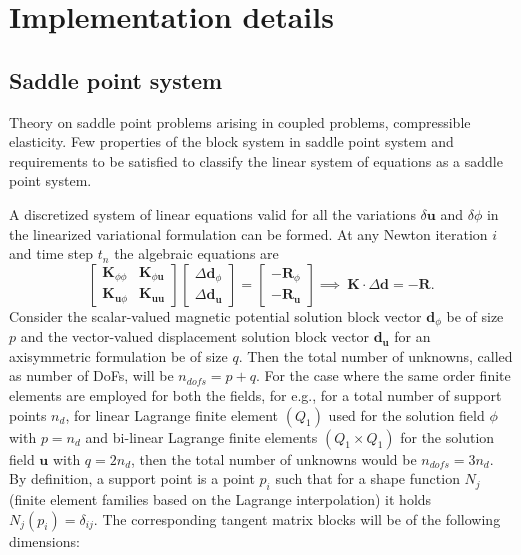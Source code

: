 \documentclass[11pt,a4paper,final]{article}
\begin{document}
\section{Implementation details}

\subsection{Saddle point system}
Theory on saddle point problems arising in coupled problems, compressible elasticity. Few properties of the block system in saddle point system and requirements to be satisfied to classify the linear system of equations as a saddle point system. \par 

A discretized system of linear equations valid for all the variations $\delta \mathbf{u}$ and $\delta \phi$ in the linearized variational formulation can be formed. At any Newton iteration $i$ and time step $t_n$ the algebraic equations are
\begin{equation}
\begin{bmatrix}
\mathbf{K}_{\phi \phi} & \mathbf{K}_{\phi \mathbf{u}} \\
\mathbf{K}_{\mathbf{u} \phi} & \mathbf{K}_{\mathbf{u} \mathbf{u}}
\end{bmatrix}
\begin{bmatrix}
\Delta \mathbf{d}_{\phi} \\
\Delta \mathbf{d}_{\mathbf{u}}
\end{bmatrix}
=
\begin{bmatrix}
-\mathbf{R}_{\phi} \\
-\mathbf{R}_{\mathbf{u}}
\end{bmatrix}
\implies \ \mathbf{K} \cdot \Delta \mathbf{d} = -\mathbf{R}.
\label{eq:3.10}
\end{equation}
Consider the scalar-valued magnetic potential solution block vector $\mathbf{d}_{\phi}$ be of size $p$ and the vector-valued displacement solution block vector $\mathbf{d}_{\mathbf{u}}$ for an axisymmetric formulation be of size $q$. Then the total number of unknowns, called as number of DoFs, will be $n_{dofs} = p + q$. For the case where the same order finite elements are employed for both the fields, for e.g., for a total number of support points $n_d$, for linear Lagrange finite element $(Q_1)$ used for the solution field $\phi$ with $p = n_d$ and bi-linear Lagrange finite elements $(Q_1 \times Q_1)$ for the solution field $\mathbf{u}$ with $q = 2 n_d$, then the total number of unknowns would be $n_{dofs} = 3 n_d$. By definition, a support point is a point $p_i$ such that for a shape function $N_j$ (finite element families based on the Lagrange interpolation) it holds $N_j (p_i) = \delta_{ij}$. The corresponding tangent matrix blocks will be of the following dimensions:
\end{document}
